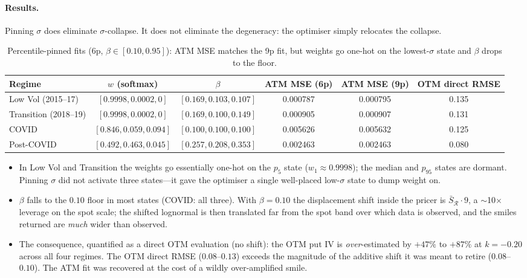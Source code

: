 \documentclass[12pt]{article}
\begin{document}
\paragraph{Results.} Pinning $\sigma$ does eliminate $\sigma$-collapse. It does not eliminate the degeneracy: the optimiser simply relocates the collapse.

\begin{table}[htbp]
\centering
\caption{Percentile-pinned fits (6p, $\beta \in [0.10,0.95]$): ATM MSE matches the 9p fit, but weights go one-hot on the lowest-$\sigma$ state and $\beta$ drops to the floor.}
\label{tab:6p}
\small
\begin{tabular}{lccccc}
\toprule
Regime & $w$ (softmax) & $\beta$ & ATM MSE (6p) & ATM MSE (9p) & OTM direct RMSE \\
\midrule
Low Vol (2015--17) & $[0.9998,0.0002,0]$ & $[0.169,0.103,0.107]$ & 0.000787 & 0.000795 & 0.135 \\
Transition (2018--19) & $[0.9998,0.0002,0]$ & $[0.169,0.100,0.149]$ & 0.000905 & 0.000907 & 0.131 \\
COVID & $[0.846,0.059,0.094]$ & $[0.100,0.100,0.100]$ & 0.005626 & 0.005632 & 0.125 \\
Post-COVID & $[0.492,0.463,0.045]$ & $[0.257,0.208,0.353]$ & 0.002463 & 0.002463 & 0.080 \\
\bottomrule
\end{tabular}
\end{table}

\begin{itemize}
  \item In Low Vol and Transition the weights go essentially one-hot on the $p_5$ state ($w_1 \approx 0.9998$); the median and $p_{95}$ states are dormant. Pinning $\sigma$ did not activate three states---it gave the optimiser a single well-placed low-$\sigma$ state to dump weight on.
  \item $\beta$ falls to the $0.10$ floor in most states (COVID: all three). With $\beta = 0.10$ the displacement shift inside the pricer is $\bar S_{\mathcal R}\cdot 9$, a $\sim$10$\times$ leverage on the spot scale; the shifted lognormal is then translated far from the spot band over which data is observed, and the smiles returned are \emph{much} wider than observed.
  \item The consequence, quantified as a direct OTM evaluation (no shift): the OTM put IV is \emph{over}-estimated by $+47\%$ to $+87\%$ at $k=-0.20$ across all four regimes. The OTM direct RMSE ($0.08$--$0.13$) exceeds the magnitude of the additive shift it was meant to retire ($0.08$--$0.10$). The ATM fit was recovered at the cost of a wildly over-amplified smile.
\end{itemize}
\end{document}
